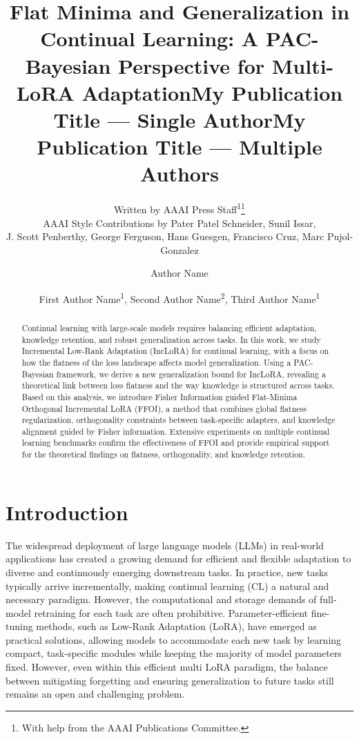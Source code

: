 \documentclass[letterpaper]{article} %
\title{Flat Minima and Generalization in Continual Learning: A PAC-Bayesian Perspective for Multi-LoRA Adaptation}
\author{
    Written by AAAI Press Staff\textsuperscript{\rm 1}\thanks{With help from the AAAI Publications Committee.}\\
    AAAI Style Contributions by Pater Patel Schneider,
    Sunil Issar,\\
    J. Scott Penberthy,
    George Ferguson,
    Hans Guesgen,
    Francisco Cruz\equalcontrib,
    Marc Pujol-Gonzalez\equalcontrib
}
\title{My Publication Title --- Single Author}
\author {
    Author Name
}
\title{My Publication Title --- Multiple Authors}
\author {
    First Author Name\textsuperscript{\rm 1},
    Second Author Name\textsuperscript{\rm 2},
    Third Author Name\textsuperscript{\rm 1}
}
\begin{document}
\maketitle

\begin{abstract}
Continual learning with large-scale models requires balancing efficient adaptation, knowledge retention, and robust generalization across tasks. In this work, we study Incremental Low-Rank Adaptation (IncLoRA) for continual learning, with a focus on how the flatness of the loss landscape affects model generalization. Using a PAC-Bayesian framework, we derive a new generalization bound for IncLoRA, revealing a theoretical link between loss flatness and the way knowledge is structured across tasks. Based on this analysis, we introduce Fisher Information guided Flat-Minima Orthogonal Incremental LoRA (FFOI), a method that combines global flatness regularization, orthogonality constraints between task-specific adapters, and knowledge alignment guided by Fisher information. Extensive experiments on multiple continual learning benchmarks confirm the effectiveness of FFOI and provide empirical support for the theoretical findings on flatness, orthogonality, and knowledge retention.
\end{abstract}



\section{Introduction}

The widespread deployment of large language models (LLMs) in real-world applications has created a growing demand for efficient and flexible adaptation to diverse and continuously emerging downstream tasks. In practice, new tasks typically arrive incrementally, making continual learning (CL) a natural and necessary paradigm. However, the computational and storage demands of full-model retraining for each task are often prohibitive. Parameter-efficient fine-tuning methods, such as Low-Rank Adaptation (LoRA), have emerged as practical solutions, allowing models to accommodate each new task by learning compact, task-specific modules while keeping the majority of model parameters fixed. However, even within this efficient multi LoRA paradigm, the balance between mitigating forgetting and ensuring generalization to future tasks still remains an open and challenging problem.
\end{document}
